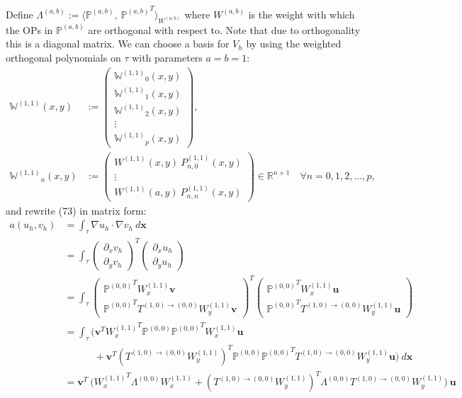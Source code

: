 \documentclass[11pt, oneside]{article}   	%
\newcommand{\R}{\mathbb{R}}
\newcommand{\bigP}{\mathbb{P}}
\newcommand{\Wii}{W^{(1,1)}}
\newcommand{\Pii}{P^{(1,1)}}
\newcommand{\bigPoo}{{\mathbb{P}^{(0,0)}}}
\newcommand{\element}{\tau}
\newcommand{\bigWii}{{\mathbb{W}^{(1,1)}}}
\begin{document}
Define $\Lambda^{(a,b)} := \langle \bigP^{(a,b)}, \: {\bigP^{(a,b)}}^T \rangle_{W^{(a,b)}}$ where $W^{(a,b)}$ is the weight with which the OPs in $\bigP^{(a,b)}$ are orthogonal with respect to. Note that due to orthogonality this is a diagonal matrix. We can choose a basis for $V_h$ by using the weighted orthogonal polynomials on $\element$ with parameters $a = b = 1$:
\begin{align}
\bigWii(x,y) &:= \begin{pmatrix}
		\bigWii_0(x,y) \\
		\bigWii_1(x,y) \\
		\bigWii_2(x,y) \\
		\vdots \\
		\bigWii_p(x,y)
	\end{pmatrix}, \\
\bigWii_n(x,y) &:= \begin{pmatrix}
		\Wii(x,y) \: \Pii_{n,0}(x,y) \\
		\vdots \\
		\Wii(a,y) \: \Pii_{n,n}(x,y)
	\end{pmatrix} \in \R^{n+1} \quad \forall n = 0,1,2,\dots,p,
\end{align}
and rewrite (73) in matrix form:
\begin{align}
	a(u_h,v_h) &= \int_\element \nabla u_h \cdot \nabla v_h \: d\mathbf{x} \\
	&= \int_\element \begin{pmatrix}
					\partial_x v_h \\
					\partial_y v_h
				\end{pmatrix}^T 
				\begin{pmatrix}
					\partial_x u_h \\
					\partial_y u_h
				\end{pmatrix}
				\\
	&= \int_\element \begin{pmatrix}
					\bigPoo^T \Wii_x \mathbf{v} \\
					\bigPoo^T T^{(1,0)\to(0,0)} \Wii_y \mathbf{v}
				\end{pmatrix}^T 
				\begin{pmatrix}
					\bigPoo^T \Wii_x \mathbf{u} \\
					\bigPoo^T T^{(1,0)\to(0,0)} \Wii_y \mathbf{u}
				\end{pmatrix}
				\\
	&= \int_\element \Big( \mathbf{v}^T {\Wii_x}^T \bigPoo \bigPoo^T \Wii_x \mathbf{u} \nonumber \\
					& \quad \quad \quad + \mathbf{v}^T ({T^{(1,0)\to(0,0)} \Wii_y})^T \bigPoo \bigPoo^T T^{(1,0)\to(0,0)} \Wii_y \mathbf{u}  \Big) \: d\mathbf{x} \\
	&= \mathbf{v}^T \: \Big( {\Wii_x}^T \Lambda^{(0,0)} \Wii_x + ({T^{(1,0)\to(0,0)} \Wii_y})^T \Lambda^{(0,0)} T^{(1,0)\to(0,0)} \Wii_y \Big) \: \mathbf{u}
\end{align}
\end{document}
